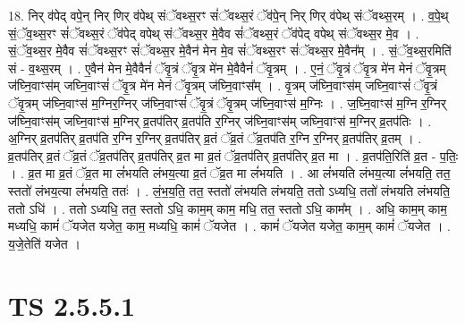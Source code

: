 \documentclass[17pt]{extarticle}
\begin{document}
18. निर् व॑पेद् वपे॒न् निर् णिर् व॑पेथ् संॅवथ्स॒रꣳ सं॑ॅवथ्स॒रं ॅव॑पे॒न् निर् णिर् व॑पेथ् संॅवथ्स॒रम् । . व॒पे॒थ् सं॒ॅव॒थ्स॒रꣳ सं॑ॅवथ्स॒रं ॅव॑पेद् वपेथ् संॅवथ्स॒र मे॒वैव सं॑ॅवथ्स॒रं ॅव॑पेद् वपेथ् संॅवथ्स॒र मे॒व । . सं॒ॅव॒थ्स॒र मे॒वैव सं॑ॅवथ्स॒रꣳ सं॑ॅवथ्स॒र मे॒वैन॑ मेन मे॒व सं॑ॅवथ्स॒रꣳ सं॑ॅवथ्स॒र मे॒वैन᳚म् । . सं॒ॅव॒थ्स॒रमिति॑ सं - व॒थ्स॒रम् । . ए॒वैन॑ मेन मे॒वैवैनं॑ ॅवृ॒त्रं ॅवृ॒त्र मे॑न मे॒वैवैनं॑ ॅवृ॒त्रम् । . ए॒नं॒ ॅवृ॒त्रं ॅवृ॒त्र मे॑न मेनं ॅवृ॒त्रम् ज॑घ्नि॒वाꣳस॑म् जघ्नि॒वाꣳसं॑ ॅवृ॒त्र मे॑न मेनं ॅवृ॒त्रम् ज॑घ्नि॒वाꣳस᳚म् । . वृ॒त्रम् ज॑घ्नि॒वाꣳस॑म् जघ्नि॒वाꣳसं॑ ॅवृ॒त्रं ॅवृ॒त्रम् ज॑घ्नि॒वाꣳस॑ म॒ग्निर॒ग्निर् ज॑घ्नि॒वाꣳसं॑ ॅवृ॒त्रं ॅवृ॒त्रम् ज॑घ्नि॒वाꣳस॑ म॒ग्निः । . ज॒घ्नि॒वाꣳस॑ म॒ग्नि र॒ग्निर् ज॑घ्नि॒वाꣳस॑म् जघ्नि॒वाꣳस॑ म॒ग्निर् व्र॒तप॑तिर् व्र॒तप॑ति र॒ग्निर् ज॑घ्नि॒वाꣳस॑म् जघ्नि॒वाꣳस॑ म॒ग्निर् व्र॒तप॑तिः । . अ॒ग्निर् व्र॒तप॑तिर् व्र॒तप॑ति र॒ग्नि र॒ग्निर् व्र॒तप॑तिर् व्र॒तं ॅव्र॒तं ॅव्र॒तप॑ति र॒ग्नि र॒ग्निर् व्र॒तप॑तिर् व्र॒तम् । . व्र॒तप॑तिर् व्र॒तं ॅव्र॒तं ॅव्र॒तप॑तिर् व्र॒तप॑तिर् व्र॒त मा व्र॒तं ॅव्र॒तप॑तिर् व्र॒तप॑तिर् व्र॒त मा । . व्र॒तप॑ति॒रिति॑ व्र॒त - प॒तिः॒ । . व्र॒त मा व्र॒तं ॅव्र॒त मा लं॑भयति लंभय॒त्या व्र॒तं ॅव्र॒त मा लं॑भयति । . आ लं॑भयति लंभय॒त्या लं॑भयति॒ तत॒ स्ततो॑ लंभय॒त्या लं॑भयति॒ ततः॑ । . लं॒भ॒य॒ति॒ तत॒ स्ततो॑ लंभयति लंभयति॒ ततो ऽध्यधि॒ ततो॑ लंभयति लंभयति॒ ततो ऽधि॑ । . ततो ऽध्यधि॒ तत॒ स्ततो ऽधि॒ काम॒म् काम॒ मधि॒ तत॒ स्ततो ऽधि॒ काम᳚म् । . अधि॒ काम॒म् काम॒ मध्यधि॒ कामं॑ ॅयजेत यजेत॒ काम॒ मध्यधि॒ कामं॑ ॅयजेत । . कामं॑ ॅयजेत यजेत॒ काम॒म् कामं॑ ॅयजेत । . य॒जे॒तेति॑ यजेत । \newline
\pagebreak
{}
\section*{ TS 2.5.5.1 }
\end{document}
